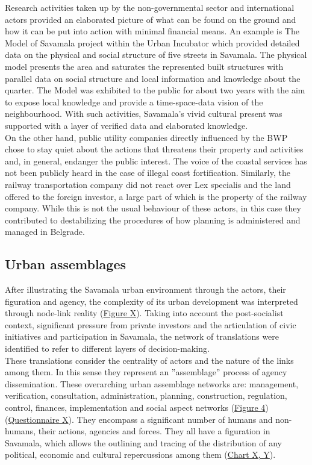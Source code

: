 \documentclass[11pt]{report}
\begin{document}
Research activities taken up by the non-governmental sector and international actors provided an elaborated picture of what can be found on the ground and how it can be put into action with minimal financial means. An example is The Model of Savamala project within the Urban Incubator which provided detailed data on the physical and social structure of five streets in Savamala. The physical model presents the area and saturates the represented built structures with parallel data on social structure and local information and knowledge about the quarter. The Model was exhibited to the public for about two years with the aim to expose local knowledge and provide a time-space-data vision of the neighbourhood. With such activities, Savamala’s vivid cultural present was supported with a layer of verified data and elaborated knowledge.
\\

On the other hand, public utility companies directly influenced by the BWP chose to stay quiet about the actions that threatens their  property  and  activities  and, in general,  endanger the public interest. The voice of the coastal services has not been publicly heard in the case of illegal coast fortification. Similarly, the railway transportation company did not react over Lex specialis and the land offered to the foreign investor, a large part of which is the property of the railway company. While this is not the usual behaviour of these actors, in this case they contributed to destabilizing the procedures of how planning is administered and managed in Belgrade.

\subsection{Urban assemblages}

After illustrating the Savamala urban environment through the actors, their figuration and agency, the complexity of its urban development was interpreted through node-link reality (\href{Figure 8}{Figure X}).
Taking into account the post-socialist context, significant pressure from private investors and the articulation of civic initiatives and participation in Savamala, the network of translations were identified to refer to different layers of decision-making.
\\

These translations consider the centrality of actors and the nature of the links among them. In this sense they represent an ”assemblage” process of agency dissemination. These overarching urban assemblage networks are: management, verification, consultation, administration, planning, construction, regulation, control, finances, implementation and social aspect networks (\href{ref}{Figure 4}) (\href{Questionnaire Experts Post-socialist}{Questionnaire X}).
They encompass a significant number of humans and non-humans, their actions, agencies and forces. They all have a figuration in Savamala, which allows the outlining and tracing of the distribution of any political, economic and cultural repercussions among them (\href{Table 5 and 6 Mira charts}{Chart X, Y}).
\\ 
\end{document}
